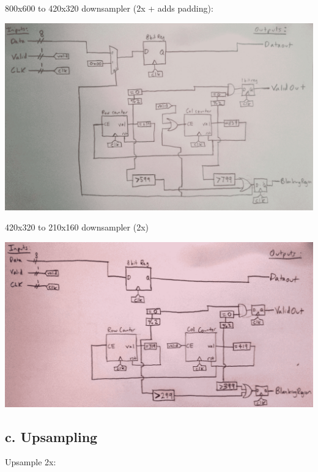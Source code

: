 \documentclass[11pt]{article}
\begin{document}
800x600 to 420x320 downsampler (2x + adds padding): \newline

\noindent\includegraphics[width=\textwidth]{modules/procdownsampler2x.png}

\newpage

\noindent 420x320 to 210x160 downsampler (2x) \newline

\noindent\includegraphics[width=\textwidth]{modules/procdownsampler2x_simple.png}

\newpage

\subsection*{c. Upsampling}

\noindent Upsample 2x: \newline
\end{document}
